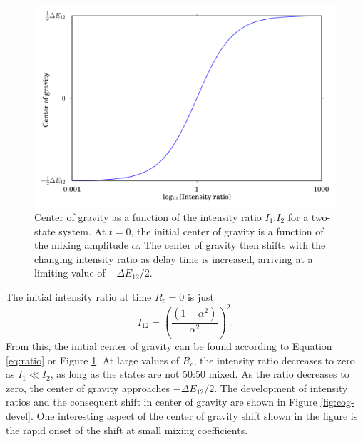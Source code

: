 \documentclass[12pt,draft]{mitthesis}
\begin{document}
\begin{figure}
  \caption{Center of gravity as a function of the intensity ratio
    $I_1$:$I_2$ for a two-state system.  At $t=0$, the initial center
    of gravity is a function of the mixing amplitude $\alpha$.  The
    center of gravity then shifts with the changing intensity ratio as
    delay time is increased, arriving at a limiting value of $-\Delta
    E_{12}/2$.}
  \label{fig:ratio}
  \centering
  \includegraphics[width=6in]{cog-from-ratio.png}
\end{figure}

The initial intensity ratio at time $R_c=0$ is just
\begin{equation}
  I_{12} = 
  \left(
    \frac{(1 - \alpha^2)}{\alpha^2}
  \right)^2.
\end{equation}
From this, the initial center of gravity can be found according to
Equation \ref{eq:ratio} or Figure \ref{fig:ratio}.  At large values of
$R_c$, the intensity ratio decreases to zero as $I_1 \ll I_2$, as long
as the states are not 50:50 mixed.  As the ratio decreases to zero,
the center of gravity approaches $-\Delta E_{12} / 2$.  The
development of intensity ratios and the consequent shift in center of
gravity are shown in Figure \ref{fig:cog-devel}.  One interesting
aspect of the center of gravity shift shown in the figure is the rapid
onset of the shift at small mixing coefficients.  
\end{document}
